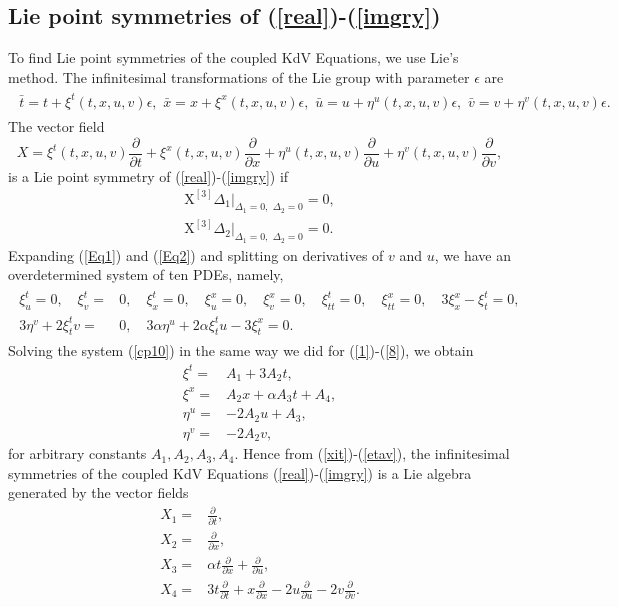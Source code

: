 \subsection{Lie point symmetries of (\ref{real})-(\ref{imgry}) \label{liepoitsymts}}
To find Lie point symmetries of the coupled KdV Equations, we use Lie's method. The infinitesimal transformations of the Lie group with parameter $\epsilon$ are 
\begin{align}
\begin{aligned}\bar{t}=t+  \xi^t(t,x,u,v)\epsilon,\,\, \bar{x}=x+  \xi^x(t,x,u,v)\epsilon,\,\,
  \bar{u}=u+  \eta^u(t,x,u,v)\epsilon,\,\, 
  \bar{v}=v+  \eta^v(t,x,u,v)\epsilon.
\label{infintli} 
\end{aligned}
\end{align}
The vector field \begin{equation}
	X= \xi^t(t,x,u,v) \frac{ \partial }{ \partial t}+ \xi^x (t,x,u,v)\frac{ \partial }{ \partial x}+ \eta^u(t,x,u,v) \frac{\partial}{ \partial u } + \eta^v(t,x,u,v) \frac{ \partial }{ \partial v},
\end{equation} is a Lie point symmetry of (\ref{real})-(\ref{imgry}) if \begin{align}\label{Eq1} \mbox{X}^{[3]}  \Delta_1\Big |_{\Delta_1=0,  \,\,\Delta_2=0} =0, \\ \label{Eq2}\mbox{X}^{[3]}  \Delta_2 \Big|_{\Delta_1=0, \,\, \Delta_2=0} =0.
\end{align} 
Expanding  (\ref{Eq1}) and (\ref{Eq2}) and splitting on derivatives of $v$ and $u$, we have an overdetermined system of ten  PDEs, namely,
\begin{align}\begin{aligned}\xi^t_u =0, \quad \xi^t_v =&0, \quad \xi^t_x =0,\quad \xi^x_u =0,\quad
 \xi^x_v =0,\quad  \xi^t_{tt}=0,\quad \xi^x_{tt}=0, \quad 3 \xi^x_x - \xi^t_t =0,\\
 3 \eta^v + 2 \xi^t_t v=&0,\quad 
  3 \alpha \eta^u + 2 \alpha \label{cp10}\xi^t_t u -3\xi^x_t =0.\end{aligned}
\end{align}
Solving the system (\ref{cp10}) in the same way we did for (\ref{1})-(\ref{8}), we obtain 
\begin{align}
\label{xit} \xi^t = & A_1+3 A_2t,\\
\label{xix} \xi^x =&A_2 x + \alpha  A_3 t + A_4,\\
\label{etau} \eta^u =&  - 2A_2 u+ A_3,\\
\label{etav} \eta^v =& -2A_2 v,
\end{align} for arbitrary constants $ A_1, A_2,A_3,A_4$.  Hence from  (\ref{xit})-(\ref{etav}),
the infinitesimal  symmetries of the coupled KdV Equations (\ref{real})-(\ref{imgry}) is a Lie algebra generated by the vector fields
\begin{align}
X_1 = &\frac{ \partial}{ \partial t}, \\
X_2 =& \frac{ \partial}{ \partial x},\\
X_3 = & \alpha t \frac{ \partial }{ \partial x}+ \frac{\partial }{ \partial u},\\
X_4 =& 3t \frac{ \partial }{ \partial t} + x\frac{ \partial}{ \partial x} - 2 u \frac{ \partial }{ \partial u}-2 v \frac{ \partial }{ \partial v}.
\end{align}
